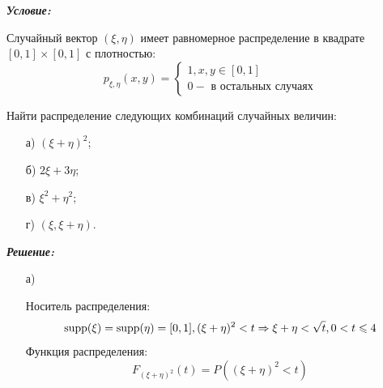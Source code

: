 \begin{exmp}
	\noindent\textit{\textbf{Условие:}}
	
	Случайный вектор $(\xi, \eta)$ имеет равномерное распределение в квадрате $[0,1] \times [0,1]$ с плотностью:
	\[
	p_{\xi, \eta} (x,y) =
	\begin{cases}
		1, x, y \in [0,1] \\
		0 - \text{ в остальных случаях}
	\end{cases}
	\]
	
	Найти распределение следующих комбинаций случайных величин:
	\begin{enumerate}
		\item[а)] $(\xi + \eta)^2$;
		\item[б)] $2 \xi + 3 \eta$;
		\item[в)] $\xi^2 + \eta^2$;
		\item[г)] $(\xi, \xi + \eta)$.
	\end{enumerate}
	
	\noindent\textit{\textbf{Решение:}}
	
	\begin{enumerate}
		\item[а)]
		
		Носитель распределения:
		\[ \operatorname{supp} (\xi) = \operatorname{supp} (\eta) = [0,1], (\xi + \eta)^2 < t \Rightarrow \xi + \eta < \sqrt{t}, 0 < t \leqslant 4 \]
		Функция распределения:
		\[ F_{(\xi + \eta)^2} (t) = P( (\xi + \eta)^2 < t ) \]
		\begin{figure}[H]
		\end{figure}
		

\end{enumerate}
\end{exmp}
